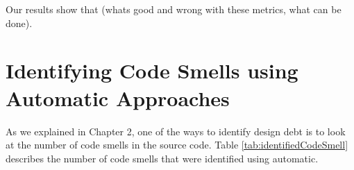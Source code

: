 Our results show that (whats good and wrong with these metrics, what can be done). 











\section{Identifying Code Smells using Automatic Approaches}
\label{sub:code_smell_detection}
As we explained in Chapter 2, one of the ways to identify design debt is to look at the number of code smells in the source code. Table \ref{tab:identifiedCodeSmell} describes the number of code smells that were identified using automatic.

